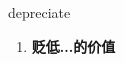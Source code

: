 
\begin{frame}
{\huge depreciate}
\begin{center}
\begin{enumerate}\Large
  \item \textbf{贬低...的价值}
\end{enumerate}
\end{center}
\end{frame}

